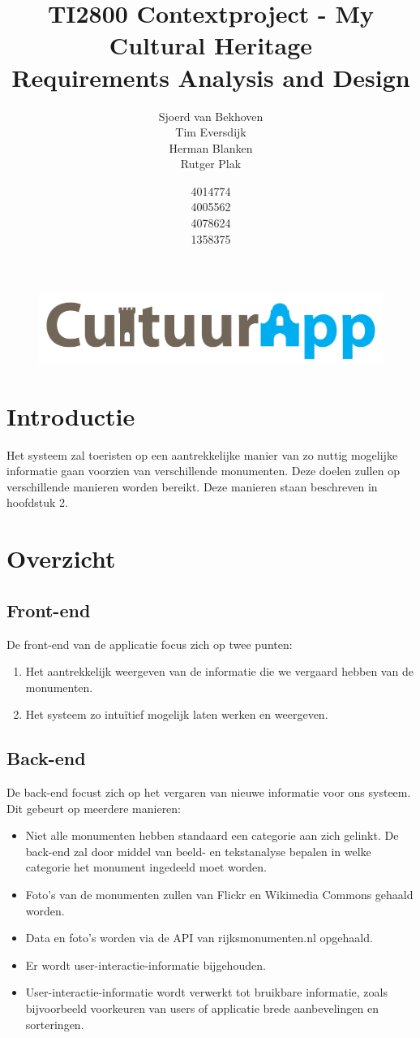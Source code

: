 \documentclass[a4paper,10pt]{article}
\newcommand{\rsection}[1]{
\section{#1}\label{sec:#1}
}
\newcommand{\rsubsection}[1]{
\subsection{#1}\label{sec:sub:#1}
}
\begin{document}
\title{TI2800 Contextproject - My Cultural Heritage\\ Requirements Analysis and Design}
\author{Sjoerd van Bekhoven\\ Tim Eversdijk \\ Herman Blanken \\ Rutger Plak \and 4014774 \\ 4005562 \\ 4078624 \\ 1358375}

\maketitle
\setcounter{page}{0}
\thispagestyle{empty}
\vspace{10cm}
\begin{figure}[ht!]
	\centering
	\includegraphics[width=\textwidth]{cultuurapp-logo.png}
\end{figure}
\clearpage

\tableofcontents

\clearpage
\rsection{Introductie}
Het systeem zal toeristen op een aantrekkelijke manier van zo nuttig mogelijke informatie gaan voorzien van verschillende monumenten. Deze doelen zullen op verschillende manieren worden bereikt. Deze manieren staan beschreven in hoofdstuk 2.

\clearpage

\rsection{Overzicht}
	\rsubsection{Front-end}
	De front-end van de applicatie focus zich op twee punten:
	\begin{enumerate}
		\item Het aantrekkelijk weergeven van de informatie die we vergaard hebben van de monumenten.
		\item Het systeem zo intu\"itief mogelijk laten werken en weergeven.
	\end{enumerate}
				
	\rsubsection{Back-end}
	De back-end focust zich op het vergaren van nieuwe informatie voor ons systeem. Dit gebeurt op meerdere manieren:
	\begin{itemize}
		\item Niet alle monumenten hebben standaard een categorie aan zich gelinkt. De back-end zal door middel van beeld- en tekstanalyse bepalen in welke categorie het monument ingedeeld moet worden.
		\item Foto's van de monumenten zullen van Flickr en Wikimedia Commons gehaald worden.
		\item Data en foto's worden via de API van rijksmonumenten.nl opgehaald.
		\item Er wordt user-interactie-informatie bijgehouden.
		\item User-interactie-informatie wordt verwerkt tot bruikbare informatie, zoals bijvoorbeeld voorkeuren van users of applicatie brede aanbevelingen en sorteringen.
	\end{itemize}
			
\end{document}
